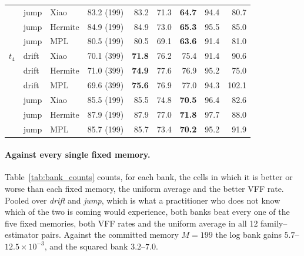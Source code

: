 \begin{table}[ht]
\begin{tabular}{lllrrrrrr}
     & jump & Xiao & 83.2 (199) & 83.2 & 71.3 & \textbf{64.7} & 94.4 & 80.7 \\
     & jump & Hermite & 84.9 (199) & 84.9 & 73.0 & \textbf{65.3} & 95.5 & 85.0 \\
     & jump & MPL & 80.5 (199) & 80.5 & 69.1 & \textbf{63.6} & 91.4 & 81.0 \\
    \addlinespace
    $t_4$ & drift & Xiao & 70.1 (399) & \textbf{71.8} & 76.2 & 75.4 & 91.4 & 90.6 \\
     & drift & Hermite & 71.0 (399) & \textbf{74.9} & 77.6 & 76.9 & 95.2 & 75.0 \\
     & drift & MPL & 69.6 (399) & \textbf{75.6} & 76.9 & 77.0 & 94.3 & 102.1 \\
     & jump & Xiao & 85.5 (199) & 85.5 & 74.8 & \textbf{70.5} & 96.4 & 82.6 \\
     & jump & Hermite & 87.9 (199) & 87.9 & 77.0 & \textbf{71.8} & 97.7 & 88.0 \\
     & jump & MPL & 85.7 (199) & 85.7 & 73.4 & \textbf{70.2} & 95.2 & 91.9 \\
    \bottomrule
  \end{tabular}
\end{table}

\paragraph{Against every single fixed memory.} Table~\ref{tab:bank_counts} counts, for each bank,
the cells in which it is better or worse than each fixed memory, the uniform average and the
better VFF rate. Pooled over \emph{drift} and \emph{jump}, which is what a practitioner who does
not know which of the two is coming would experience, both banks beat every one of the five fixed
memories, both VFF rates and the uniform average in all 12 family--estimator pairs. Against the
committed memory $M=199$ the log bank gains $5.7$--$12.5\times10^{-3}$, and the squared bank
$3.2$--$7.0$.

